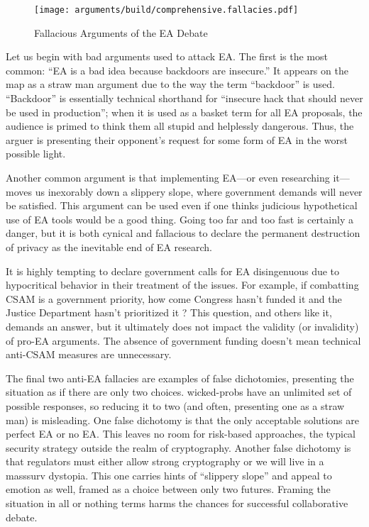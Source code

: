 
\begin{figure}[t!]
  \centering\CaptionFontSize
  \texttt{[image: arguments/build/comprehensive.fallacies.pdf]}
  \caption{Fallacious Arguments of the EA Debate}
  \label{fig-arg-fallacies}
\end{figure}

Let us begin with bad arguments used to attack \ac{EA}. The first is the most common: ``\ac{EA} is a bad idea because
backdoors are insecure.'' It appears on the map as a straw man argument due to the way the term ``backdoor'' is used.
``Backdoor'' is essentially technical shorthand for ``insecure hack that should never be used in production''; when it
is used as a basket term for all \ac{EA} proposals, the audience is primed to think them all stupid and helplessly
dangerous. Thus, the arguer is presenting their opponent's request for some form of \ac{EA} in the worst possible light.

Another common argument is that implementing \ac{EA}---or even researching it---moves us inexorably down a slippery
slope, where government demands will never be satisfied. This argument can be used even if one thinks judicious
hypothetical use of \ac{EA} tools would be a good thing. Going too far and too fast is certainly a danger, but it is
both cynical and fallacious to declare the permanent destruction of privacy as the inevitable end of \ac{EA} research.

It is highly tempting to declare government calls for \ac{EA} disingenuous due to hypocritical behavior in their
treatment of the issues. For example, if combatting \ac{CSAM} is a government priority, how come Congress hasn't funded
it and the Justice Department hasn't prioritized it \cite{keller_internet_2019}? This question, and others like it,
demands an answer, but it ultimately does not impact the validity (or invalidity) of pro-\ac{EA} arguments. The absence
of government funding doesn't mean technical anti-\ac{CSAM} measures are unnecessary.

The final two anti-\ac{EA} fallacies are examples of false dichotomies, presenting the situation as if there are only
two choices. \Acp{wicked-prob} have an unlimited set of possible responses, so reducing it to two (and often, presenting
one as a straw man) is misleading. One false dichotomy is that the only acceptable solutions are perfect \ac{EA} or no
\ac{EA}. This leaves no room for risk-based approaches, the typical security strategy outside the realm of cryptography.
Another false dichotomy is that regulators must either allow strong cryptography or we will live in a \ac{masssurv}
dystopia. This one carries hints of ``slippery slope'' and appeal to emotion as well, framed as a choice between only
two futures. Framing the situation in all or nothing terms harms the chances for successful collaborative debate.

